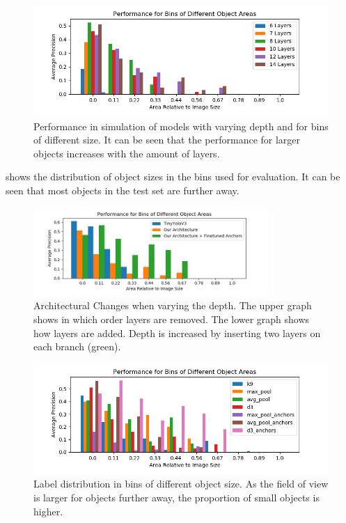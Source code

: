 \begin{figure}[hbtp]
	\centering
	\includegraphics[width=\textwidth]{fig/depth_ap_size}
	\caption{Performance in simulation of models with varying depth and for bins of different size. It can be seen that the performance for larger objects increases with the amount of layers.}
	\label{fig:depth_ap_size}
\end{figure}

 shows the distribution of object sizes in the bins used for evaluation. It can be seen that most objects in the test set are further away. 

\begin{figure}[hbtp]
	\centering
	\includegraphics[width=0.8\textwidth]{fig/hyperparam_size}
	\caption{Architectural Changes when varying the depth. The upper graph shows in which order layers are removed. The lower graph shows how layers are added. Depth is increased by inserting two layers on each branch (green). }
	\label{fig:hyp}
\end{figure}

\begin{figure}[hbtp]
	\centering
	\includegraphics[width=\textwidth]{fig/rf_ap_size}
	\caption{Label distribution in bins of different object size. As the field of view is larger for objects further away, the proportion of small objects is higher.}
	\label{fig:size_bins}
\end{figure}

